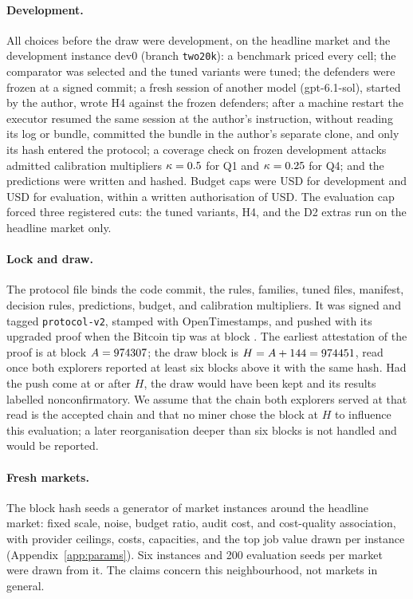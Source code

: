 \documentclass[11pt]{article}
\begin{document}
\paragraph{Development.} All choices before the draw were development, on the headline market and the development instance dev0 (branch \texttt{two20k}): a benchmark priced every cell; the comparator was selected and the tuned variants were tuned; the defenders were frozen at a signed commit; a fresh session of another model (gpt-6.1-sol), started by the author, wrote H4 against the frozen defenders; after a machine restart the executor resumed the same session at the author's instruction, without reading its log or bundle, committed the bundle in the author's separate clone, and only its hash entered the protocol; a coverage check on frozen development attacks admitted calibration multipliers $\kappa = 0.5$ for Q1 and $\kappa = 0.25$ for Q4; and the predictions were written and hashed. Budget caps were  USD for development and  USD for evaluation, within a written authorisation of  USD. The evaluation cap forced three registered cuts: the tuned variants, H4, and the D2 extras run on the headline market only.

\paragraph{Lock and draw.} The protocol file binds the code commit, the rules, families, tuned files, manifest, decision rules, predictions, budget, and calibration multipliers. It was signed and tagged \texttt{protocol-v2}, stamped with OpenTimestamps, and pushed with its upgraded proof when the Bitcoin tip was at block . The earliest attestation of the proof is at block $A = 974307$; the draw block is $H = A + 144 = 974451$, read once both explorers reported at least six blocks above it with the same hash. Had the push come at or after $H$, the draw would have been kept and its results labelled nonconfirmatory. We assume that the chain both explorers served at that read is the accepted chain and that no miner chose the block at $H$ to influence this evaluation; a later reorganisation deeper than six blocks is not handled and would be reported.

\paragraph{Fresh markets.} The block hash seeds a generator of market instances around the headline market: fixed scale, noise, budget ratio, audit cost, and cost-quality association, with provider ceilings, costs, capacities, and the top job value drawn per instance (Appendix~\ref{app:params}). Six instances and 200 evaluation seeds per market were drawn from it. The claims concern this neighbourhood, not markets in general.
\end{document}
